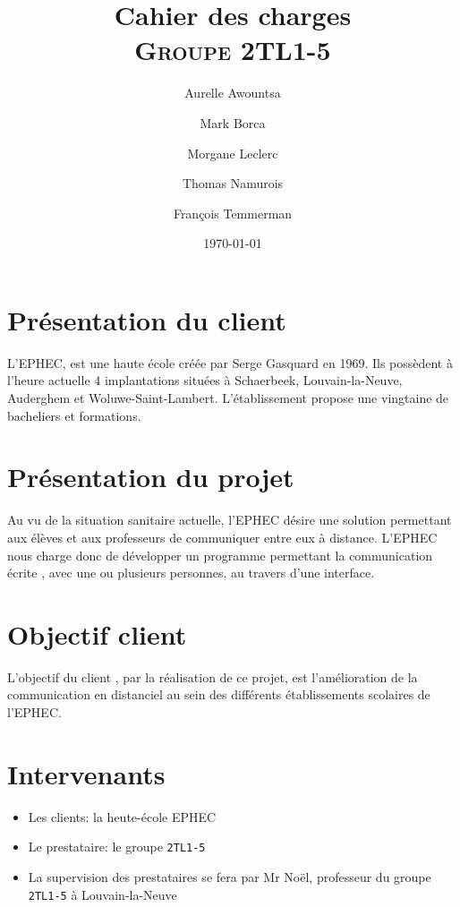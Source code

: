 \documentclass[12pt]{article}
\title{
    {\Huge Cahier des charges}
    \\ \vspace{1em} \textbf{\textsc{Groupe 2TL1-5}}
    \vspace{1em}
}
\author{
    Aurelle Awountsa
    \and Mark Borca
    \and Morgane Leclerc
    \and Thomas Namurois
    \and François Temmerman
    \vspace{1em}
}
\date{\today}
\begin{document}
\maketitle

\section{Présentation du client}

L’EPHEC, est une haute école créée par Serge Gasquard en 1969.
Ils possèdent à l’heure actuelle 4 implantations situées à 
Schaerbeek, Louvain-la-Neuve, Auderghem et Woluwe-Saint-Lambert.
L’établissement propose une vingtaine de bacheliers et formations.

\section{Présentation du projet}

Au vu de la situation sanitaire actuelle,
l’EPHEC désire une solution permettant aux élèves et aux professeurs de communiquer entre eux à distance.
L’EPHEC nous charge donc de développer un programme permettant la communication écrite
, avec une ou plusieurs personnes,
au travers d’une interface.

\section{Objectif client}

L’objectif du client
, par la réalisation de ce projet,
est l’amélioration de la communication en distanciel
au sein des différents établissements scolaires de l’EPHEC.

\section{Intervenants}

\begin{minipage}{\linewidth}
\begin{itemize}
    \item Les clients: la heute-école EPHEC
    \item Le prestataire: le groupe \texttt{2TL1-5}
    \item La supervision des prestataires se fera par Mr Noël, professeur du groupe \texttt{2TL1-5} à Louvain-la-Neuve
\end{itemize}
\end{minipage}
\end{document}
